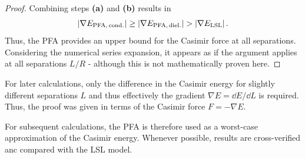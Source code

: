 \begin{proof}
  Combining steps \textbf{(a)} and \textbf{(b)} results in
  \begin{equation}
    \left\lvert\nabla E_\mathrm{PFA,\,cond.}\right\rvert \geq \left\lvert\nabla E_\mathrm{PFA,\,diel.}\right\rvert > \left\lvert\nabla E_\mathrm{LSL}\right\rvert .
  \end{equation}
  Thus, the PFA provides an upper bound for the Casimir force at all separations.
  Considering the numerical series expansion, it appears as if the argument applies at all separations $L/R$ - although this is not mathematically proven here.
\end{proof}
\begin{remark}
  For later calculations, only the difference in the Casimir energy for slightly different separations $L$ and thus effectively the gradient $\nabla E = \dd E / \dd L$ is required. Thus, the proof was given in terms of the Casimir force $F= -\nabla E$.
\end{remark}

For subsequent calculations, the PFA is therefore used as a worst-case approximation of the Casimir energy. Whenever possible, results are cross-verified anc compared with the LSL model.